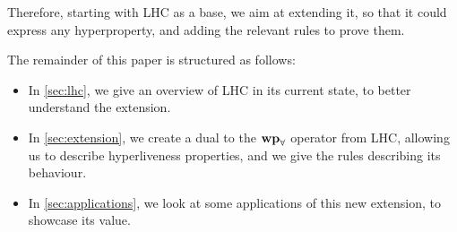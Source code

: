 Therefore, starting with LHC as a base, we aim at extending it, so that it could express any hyperproperty, and adding the relevant rules to prove them.

The remainder of this paper is structured as follows:

\begin{itemize}
    \item In \cref{sec:lhc}, we give an overview of LHC in its current state, to better understand the extension.
    \item In \cref{sec:extension}, we create a dual to the $\mathbf{wp}_{\forall}$ operator from LHC, allowing us to describe hyperliveness properties, and we give the rules describing its behaviour.
    \item In \cref{sec:applications}, we look at some applications of this new extension, to showcase its value.
\end{itemize}